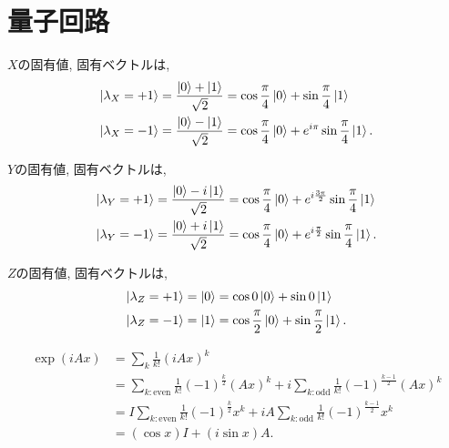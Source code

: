 \chapter{量子回路}

\begin{ex}
    \label{ex4.1}
    $X$の固有値, 固有ベクトルは,
    \begin{align*}
        \ket{\lambda_X = +1} & = \frac{\ket{0} + \ket{1}}{\sqrt{2}} = \cos\frac{\pi}{4} \ket{0} + \sin\frac{\pi}{4} \ket{1}           \\
        \ket{\lambda_X = -1} & = \frac{\ket{0} - \ket{1}}{\sqrt{2}} = \cos\frac{\pi}{4} \ket{0} + e^{i \pi}\sin\frac{\pi}{4} \ket{1}.
    \end{align*}

    $Y$の固有値, 固有ベクトルは,
    \begin{align*}
        \ket{\lambda_Y = +1} & = \frac{\ket{0} -i \ket{1}}{\sqrt{2}} = \cos\frac{\pi}{4} \ket{0} +e^{i \frac{3 \pi}{2}} \sin\frac{\pi}{4} \ket{1} \\
        \ket{\lambda_Y = -1} & = \frac{\ket{0} +i \ket{1}}{\sqrt{2}} = \cos\frac{\pi}{4} \ket{0} + e^{i \frac{\pi}{2}}\sin\frac{\pi}{4} \ket{1}.
    \end{align*}

    $Z$の固有値, 固有ベクトルは,
    \begin{align*}
        \ket{\lambda_Z = +1} & = \ket{0} = \cos0 \ket{0} +\sin0\ket{1}                            \\
        \ket{\lambda_Z = -1} & = \ket{1} = \cos\frac{\pi}{2} \ket{0} + \sin\frac{\pi}{2} \ket{1}.
    \end{align*}
\end{ex}

\begin{ex}
    \label{ex4.2}
    \begin{align*}
        \exp(iAx)
         & = \sum_{k} \frac{1}{k!} (iAx)^k                                 \\
         & = \sum_{k:\mathrm{even}} \frac{1}{k!} (-1)^{\frac{k}{2}} (Ax)^k
        +
        i \sum_{k:\mathrm{odd}} \frac{1}{k!} (-1)^{\frac{k-1}{2}} (Ax)^k
        \\
         & = I \sum_{k:\mathrm{even}} \frac{1}{k!} (-1)^{\frac{k}{2}} x^k
        +
        i A \sum_{k:\mathrm{odd}} \frac{1}{k!} (-1)^{\frac{k-1}{2}} x^k
        \\
         & = (\cos x) I + (i\sin x) A.
    \end{align*}
\end{ex}

